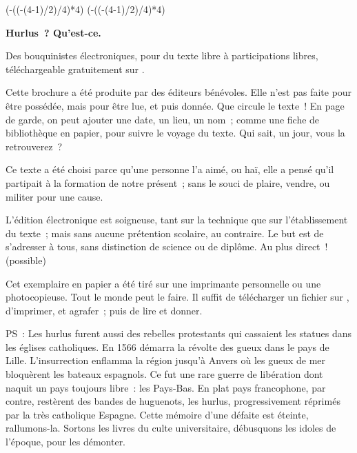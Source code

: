 \documentclass[french,twoside]{book} %
\def\truncdiv#1#2{((#1-(#2-1)/2)/#2)}
\def\moduloop#1#2{(#1-\truncdiv{#1}{#2}*#2)}
\def\modulo#1#2{\number\numexpr\moduloop{#1}{#2}\relax}
\begin{document}
\ifbooklet
  \pagestyle{empty}
  \clearpage
  \ifnum\modulo{\value{page}}{4}=0 \hbox{}\newpage\hbox{}\newpage\fi
  \ifnum\modulo{\value{page}}{4}=1 \hbox{}\newpage\hbox{}\newpage\fi


  \hbox{}\newpage
  \ifodd\value{page}\hbox{}\newpage\fi
  {\centering\color{rubric}\bfseries\noindent\large
    Hurlus ? Qu’est-ce.\par
    \bigskip
  }
  \noindent Des bouquinistes électroniques, pour du texte libre à participations libres,
  téléchargeable gratuitement sur \href{https://hurlus.fr}{}.\par
  \bigskip
  \noindent Cette brochure a été produite par des éditeurs bénévoles.
  Elle n’est pas faite pour être possédée, mais pour être lue, et puis donnée.
  Que circule le texte !
  En page de garde, on peut ajouter une date, un lieu, un nom ;
  comme une fiche de bibliothèque en papier,
  pour suivre le voyage du texte. Qui sait, un jour, vous la retrouverez ?
  \par

  Ce texte a été choisi parce qu’une personne l’a aimé,
  ou haï, elle a pensé qu’il partipait à la formation de notre présent ;
  sans le souci de plaire, vendre, ou militer pour une cause.
  \par

  L’édition électronique est soigneuse, tant sur la technique
  que sur l’établissement du texte ; mais sans aucune prétention scolaire, au contraire.
  Le but est de s’adresser à tous, sans distinction de science ou de diplôme.
  Au plus direct ! (possible)
  \par

  Cet exemplaire en papier a été tiré sur une imprimante personnelle
   ou une photocopieuse. Tout le monde peut le faire.
  Il suffit de
  télécharger un fichier sur \href{https://hurlus.fr}{},
  d’imprimer, et agrafer ; puis de lire et donner.\par

  \bigskip

  \noindent PS : Les hurlus furent aussi des rebelles protestants qui cassaient les statues dans les églises catholiques. En 1566 démarra la révolte des gueux dans le pays de Lille. L’insurrection enflamma la région jusqu’à Anvers où les gueux de mer bloquèrent les bateaux espagnols.
  Ce fut une rare guerre de libération dont naquit un pays toujours libre : les Pays-Bas.
  En plat pays francophone, par contre, restèrent des bandes de huguenots, les hurlus, progressivement réprimés par la très catholique Espagne.
  Cette mémoire d’une défaite est éteinte, rallumons-la. Sortons les livres du culte universitaire, débusquons les idoles de l’époque, pour les démonter.
\fi
\end{document}

